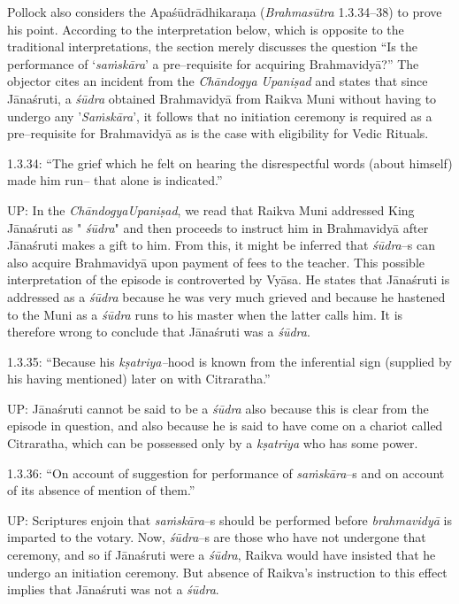 Pollock also considers the Apaśūdrādhikaraṇa (\textit{Brahmasūtra} 1.3.34–38) to prove his point. According to the interpretation below, which is opposite to the traditional interpretations, the section merely discusses the question “Is the performance of ‘\textit{saṁskāra}’ a pre–requisite for acquiring Brahmavidyā?” The objector cites an incident from the \textit{Chāndogya Upaniṣad} and states that since Jānaśruti, a \textit{śūdra} obtained Brahmavidyā from Raikva Muni without having to undergo any '\textit{Saṁskāra}', it follows that no initiation ceremony is required as a pre–requisite for Brahmavidyā as is the case with eligibility for Vedic Rituals.

1.3.34: “The grief which he felt on hearing the disrespectful words (about himself) made him run– that alone is indicated.”

UP: In the \textit{ChāndogyaUpaniṣad}, we read that Raikva Muni addressed King Jānaśruti as "\textit{ śūdra}" and then proceeds to instruct him in Brahmavidyā after Jānaśruti makes a gift to him. From this, it might be inferred that \textit{śūdra}–s can also acquire Brahmavidyā upon payment of fees to the teacher. This possible interpretation of the episode is controverted by Vyāsa. He states that Jānaśruti is addressed as a \textit{śūdra} because he was very much grieved and because he hastened to the Muni as a \textit{śūdra} runs to his master when the latter calls him. It is therefore wrong to conclude that Jānaśruti was a \textit{śūdra}.

1.3.35: “Because his \textit{kṣatriya–}hood is known from the inferential sign (supplied by his having mentioned) later on with Citraratha.”

UP: Jānaśruti cannot be said to be a \textit{śūdra} also because this is clear from the episode in question, and also because he is said to have come on a chariot called Citraratha, which can be possessed only by a \textit{kṣatriya} who has some power.

1.3.36: “On account of suggestion for performance of \textit{saṁskāra}–s and on account of its absence of mention of them.”

UP: Scriptures enjoin that \textit{saṁskāra}–s should be performed before \textit{brahmavidyā} is imparted to the votary. Now, \textit{śūdra}–s are those who have not undergone that ceremony, and so if Jānaśruti were a \textit{śūdra}, Raikva would have insisted that he undergo an initiation ceremony. But absence of Raikva's instruction to this effect implies that Jānaśruti was not a \textit{śūdra}.

